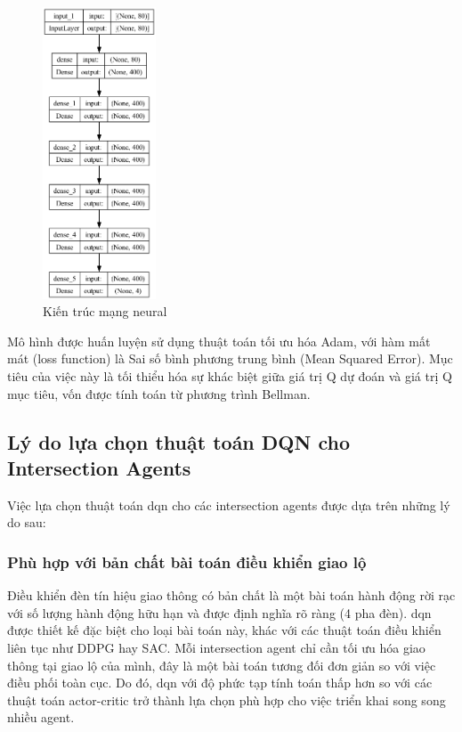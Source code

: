 \begin{figure}[!htp]
    \centering
    \includegraphics[width=0.3\textwidth]{img/model_structure}
    \caption{Kiến trúc mạng neural}
    \label{fig:model_structure}
\end{figure}

Mô hình được huấn luyện sử dụng thuật toán tối ưu hóa Adam, với hàm mất mát (loss function) là Sai số bình phương trung bình (Mean Squared Error). Mục tiêu của việc này là tối thiểu hóa sự khác biệt giữa giá trị Q dự đoán và giá trị Q mục tiêu, vốn được tính toán từ phương trình Bellman.

\subsection{Lý do lựa chọn thuật toán DQN cho Intersection Agents}
Việc lựa chọn thuật toán \ac{dqn} cho các intersection agents được dựa trên những lý do sau:

\subsubsection{Phù hợp với bản chất bài toán điều khiển giao lộ}
Điều khiển đèn tín hiệu giao thông có bản chất là một bài toán hành động rời rạc với số lượng hành động hữu hạn và được định nghĩa rõ ràng (4 pha đèn). \ac{dqn} được thiết kế đặc biệt cho loại bài toán này, khác với các thuật toán điều khiển liên tục như DDPG hay SAC. Mỗi intersection agent chỉ cần tối ưu hóa giao thông tại giao lộ của mình, đây là một bài toán tương đối đơn giản so với việc điều phối toàn cục. Do đó, \ac{dqn} với độ phức tạp tính toán thấp hơn so với các thuật toán actor-critic trở thành lựa chọn phù hợp cho việc triển khai song song nhiều agent.

